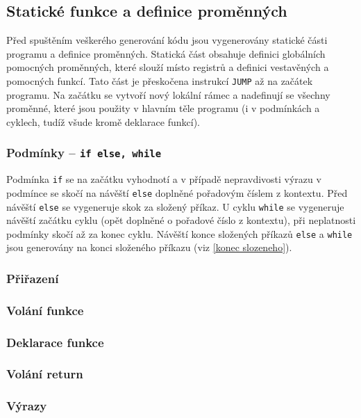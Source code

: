 \documentclass[a4paper, 12pt]{article}
\begin{document}
    \subsection{Statické funkce a definice proměnných}
    Před spuštěním veškerého generování kódu jsou vygenerovány statické části programu a definice proměnných. Statická část obsahuje definici globálních pomocných proměnných, které slouží místo registrů a definici vestavěných a pomocných funkcí. Tato část je přeskočena instrukcí \texttt{JUMP} až na začátek programu. Na začátku se vytvoří nový lokální rámec a nadefinují se všechny proměnné, které jsou použity v hlavním těle programu (i v podmínkách a cyklech, tudíž všude kromě deklarace funkcí).

    \subsubsection{Podmínky -- \texttt{if else, while}}
    Podmínka \texttt{if} se na začátku vyhodnotí a v případě nepravdivosti výrazu v podmínce se skočí na návěští \texttt{else} doplněné pořadovým číslem z kontextu. Před návěští \texttt{else} se vygeneruje skok za složený příkaz. U cyklu \texttt{while} se vygeneruje návěští začátku cyklu (opět doplněné o pořadové číslo z kontextu), při neplatnosti podmínky skočí až za konec cyklu. Návěští konce složených příkazů \texttt{else} a \texttt{while} jsou generovány na konci složeného příkazu (viz \ref{konec slozeneho}).

    \subsubsection{Přiřazení}
    \subsubsection{Volání funkce}
    \subsubsection{Deklarace funkce}
    \subsubsection{Volání return}
    \subsubsection{Výrazy}
\end{document}
